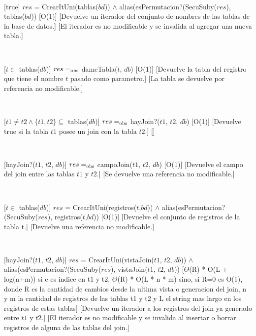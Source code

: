 \begin{Interfaz}
~

[true]
{$res$ = CrearItUni(tablas($bd$)) $\land$ alias(esPermutacion?(SecuSuby($res$), tablas($bd$))}
[O(1)]
[Devuelve un iterador del conjunto de nombres de las tablas de la base de datos.]
[El iterador es no modificable y se invalida al agregar una nueva tabla.]

~

[$t \in$ tablas($db$)]
{$res =_{\mathrm{obs}}$ dameTabla($t$, $db$)}
[O(1)]
[Devuelve la tabla del registro que tiene el nombre $t$ pasado como parametro.]
[La tabla se devuelve por referencia no modificable.]

~

[$t1 \neq t2 \land \{t1, t2\} \subseteq$ tablas($db$)]
{$res =_{\mathrm{obs}}$ hayJoin?($t1$, $t2$, $db$)}
[O(1)]
[Devuelve true si la tabla $t1$ posee un join con la tabla $t2$.]
[]

~

[hayJoin?($t1$, $t2$, $db$)]
{$res =_{\mathrm{obs}}$ campoJoin($t1$, $t2$, $db$)}
[O(1)]
[Devuelve el campo del join entre las tablas $t1$ y $t2$.]
[Se devuelve una referencia no modificable.]

~

[$t \in$ tablas($db$)]
{$res$ = CrearItUni(registros($t$,$bd$)) $\land$ alias(esPermutacion?(SecuSuby($res$), registros($t$,$bd$))}
[O(1)]
[Devuelve el conjunto de registros de la tabla t.]
[Devuelve una referencia no modificable.]

~

[hayJoin?($t1$, $t2$, $db$)]
{$res$ = CrearItUni(vistaJoin($t1$, $t2$, $db$)) $\land$ alias(esPermutacion?(SecuSuby($res$), vistaJoin($t1$, $t2$, $db$))}
[$\Theta$(R) * O(L + log(n+m)) si c es indice en t1 y t2, $\Theta$(R) * O(L * n * m) sino, si R=0 es O(1), donde R es la cantidad de cambios desde la ultima vista o generacion del join, n y m la cantidad de registros de las tablas t1 y t2 y L el string mas largo en los registros de estas tablas]
[Devuelve un iterador a los registros del join ya generado entre $t1$ y $t2$.]
[El iterador es no modificable y se invalida al insertar o borrar registros de alguna de las tablas del join.]


\end{Interfaz}
